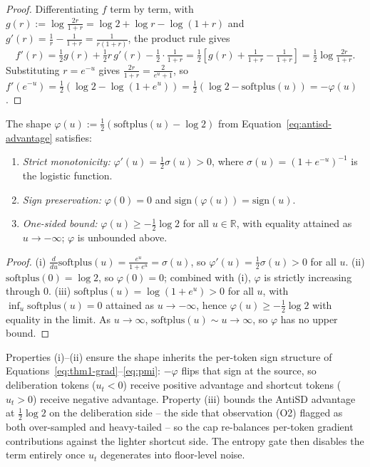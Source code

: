 \documentclass{llmxive}
\begin{document}
\begin{proof}
  Differentiating $f$ term by term, with $g(r) := \log\frac{2r}{1+r} = \log 2 + \log r - \log(1+r)$ and $g'(r) = \frac{1}{r} - \frac{1}{1+r} = \frac{1}{r(1+r)}$, the product rule gives
  \begin{equation*}
    f'(r) = \tfrac12 g(r) + \tfrac12 r\,g'(r) - \tfrac12 \cdot \tfrac{1}{1+r} = \tfrac12\!\left[g(r) + \tfrac{1}{1+r} - \tfrac{1}{1+r}\right] = \tfrac12 \log \tfrac{2r}{1+r}.
  \end{equation*}
  Substituting $r = e^{-u}$ gives $\frac{2r}{1+r} = \frac{2}{e^u+1}$, so $f'(e^{-u}) = \tfrac12(\log 2 - \log(1+e^u)) = \tfrac12(\log 2 - \mathrm{softplus}(u)) = -\varphi(u)$.
\end{proof}

\begin{lemma}
  \label{lem:phi-props}
  The shape $\varphi(u) := \tfrac12(\mathrm{softplus}(u) - \log 2)$ from Equation~\eqref{eq:antisd-advantage} satisfies:
  \begin{enumerate}
    \item[\textnormal{(i)}] \emph{Strict monotonicity:} $\varphi'(u) = \tfrac{1}{2}\sigma(u) > 0$, where $\sigma(u) = (1+e^{-u})^{-1}$ is the logistic function.
    \item[\textnormal{(ii)}] \emph{Sign preservation:} $\varphi(0) = 0$ and $\mathrm{sign}(\varphi(u)) = \mathrm{sign}(u)$.
    \item[\textnormal{(iii)}] \emph{One-sided bound:} $\varphi(u) \ge -\tfrac{1}{2}\log 2$ for all $u \in \mathbb{R}$, with equality attained as $u \to -\infty$; $\varphi$ is unbounded above.
  \end{enumerate}
\end{lemma}

\begin{proof}
  \textnormal{(i)} $\frac{d}{du}\mathrm{softplus}(u) = \frac{e^u}{1+e^u} = \sigma(u)$, so $\varphi'(u) = \tfrac12 \sigma(u) > 0$ for all $u$.
  \textnormal{(ii)} $\mathrm{softplus}(0) = \log 2$, so $\varphi(0) = 0$; combined with (i), $\varphi$ is strictly increasing through $0$.
  \textnormal{(iii)} $\mathrm{softplus}(u) = \log(1 + e^u) > 0$ for all $u$, with $\inf_u \mathrm{softplus}(u) = 0$ attained as $u \to -\infty$, hence $\varphi(u) \ge -\tfrac{1}{2}\log 2$ with equality in the limit. As $u \to \infty$, $\mathrm{softplus}(u) \sim u \to \infty$, so $\varphi$ has no upper bound.
\end{proof}

Properties (i)--(ii) ensure the shape inherits the per-token sign structure of Equations~\eqref{eq:thm1-grad}--\eqref{eq:pmi}: $-\varphi$ flips that sign at the source, so deliberation tokens ($u_t < 0$) receive positive advantage and shortcut tokens ($u_t > 0$) receive negative advantage. Property (iii) bounds the AntiSD advantage at $\tfrac12 \log 2$ on the deliberation side -- the side that observation (O2) flagged as both over-sampled and heavy-tailed -- so the cap re-balances per-token gradient contributions against the lighter shortcut side. The entropy gate then disables the term entirely once $u_t$ degenerates into floor-level noise.
\end{document}
